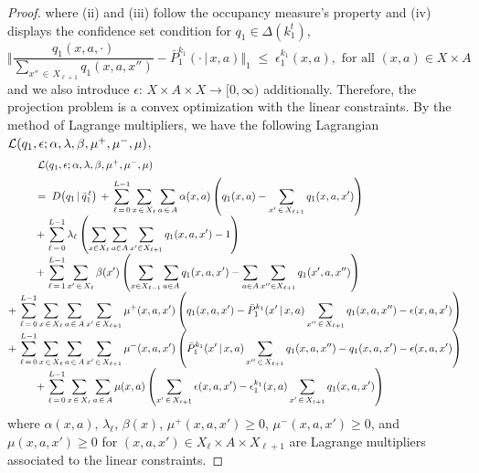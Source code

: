 \documentclass[12pt, final]{l4dc2023}
\begin{document}
\begin{proof}
	\noindent where (ii) and (iii) follow the occupancy measure's property and (iv) displays the confidence set condition for $q_1\in \Delta(k_1^t)$,
	\[
	\Bigg\Vert \frac{q_1(x,a,\cdot)}{\sum_{x''\,\in\,X_{\ell+1}}q_1(x,a,x'') }- \bar P_1^{k_1}(\cdot\,\vert\,x,a) \Bigg\Vert_1 \; \leq \; \epsilon_1^{k_1}(x,a), \text{ for all }(x,a) \in X\times A
	\]
	and we also introduce $\epsilon$: $X\times A\times X\to [0,\infty)$ additionally. Therefore, the projection problem is a convex optimization with the linear constraints. By the method of Lagrange multipliers, we have the following Lagrangian ${\mathcal{L}}(q_1,\epsilon; \alpha, \lambda,\beta,\mu^+,\mu^-,\mu)$,
	\[
	\begin{array}{rcl}
	&& \;\calL(q_1,\epsilon; \alpha, \lambda,\beta,\mu^+,\mu^-,\mu) 
	\\[0.2cm]
	&& \displaystyle \;=\;  D\big(q_1\,\vert\,  \bar{q}_1^{\,t}\big) \,+\, \sum_{\ell\,=\,0}^{L-1} \sum_{x\,\in\,X_\ell}\sum_{a\,\in\, A}\alpha(x,a)\rbr{q_1(x, a) - \sum_{x'\,\in\,X_{\ell+1}} q_1(x,a,x')}
	\\[0.2cm]
	&& \displaystyle \,+\, \sum_{\ell\,=\,0}^{L-1}\lambda_\ell\rbr{\sum_{x\in X_\ell}\sum_{a\in A}\sum_{x'\in X_{\ell+1}} q_1(x, a, x') - 1}
	\\[0.2cm]
	&& \displaystyle \,+\, \sum_{\ell\,=\,1}^{L-1}\sum_{x'\,\in\,X_\ell}\beta(x') \rbr{\sum_{x\in X_{\ell-1}}\sum_{a\in A} q_1(x, a, x') -\sum_{a\in A}\sum_{x''\in X_{\ell+1}} q_1(x', a, x'')}
	\\[0.2cm]
	&& \!\!\!\! \!\!\!\! \!\!\!\! \!\!\!\! 
	\displaystyle \,+\, \sum_{\ell\,=\,0}^{L-1}\sum_{x\,\in\,X_\ell}\sum_{a\,\in\, A}\sum_{x'\,\in\,X_{\ell+1}} \mu^+(x,a,x')\rbr{q_1(x,a,x')-\bar P_1^{k_1}(x'\,\vert\,x,a) \sum_{x''\,\in\,X_{\ell+1}}q_1(x,a,x'') - \epsilon(x,a,x')}
	\\[0.2cm]
	&& \!\!\!\! \!\!\!\! \!\!\!\! \!\!\!\! 
	\displaystyle \,+\, \sum_{\ell\,=\,0}^{L-1}\sum_{x\,\in\,X_\ell}\sum_{a\,\in\, A}\sum_{x'\,\in\,X_{\ell+1}} \mu^-(x,a,x')\rbr{\bar P_1^{k_1}(x'\,\vert\,x,a) \sum_{x''\,\in\,X_{\ell+1}}q_1(x,a,x'') -q_1(x,a,x')- \epsilon(x,a,x')}
	\\[0.2cm]
	&& \displaystyle \,+\, \sum_{\ell\,=\,0}^{L-1}\sum_{x\,\in\,X_\ell}\sum_{a\,\in\,A}\mu(x,a) \rbr{\sum_{x'\,\in\,X_{\ell+1}} \epsilon(x,a,x') - \epsilon_1^{k_1}(x,a) \sum_{x'\,\in\,X_{\ell+1}}q_1(x,a,x')}
	\end{array}
	\]
	where $\alpha (x,a)$, $\lambda_\ell$, $\beta(x)$, $\mu^+(x,a,x')\geq0$, $\mu^-(x,a,x')\geq0$, and $\mu(x,a,x')\geq0$ for $(x,a,x')\in X_\ell\times A\times X_{\ell+1}$ are Lagrange multipliers associated to the linear constraints. 
	

\end{proof}
\end{document}
